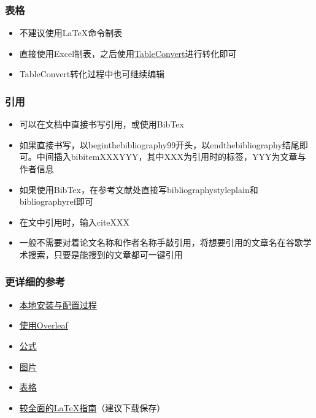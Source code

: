 \documentclass{beamer}
\begin{document}
\begin{frame} 
    \frametitle{表格} 
    \begin{itemize} 
        \item 不建议使用\LaTeX{}命令制表
        \item 直接使用Excel制表，之后使用\href{https://tableconvert.com/}{TableConvert}进行转化即可
        \item TableConvert转化过程中也可继续编辑
    \end{itemize} 
\end{frame}

\begin{frame} 
    \frametitle{引用} 
    \begin{itemize} 
        \item 可以在文档中直接书写引用，或使用BibTex
        \item 如果直接书写，以begin{thebibliography}{99}开头，以end{thebibliography}结尾即可。中间插入bibitem{XXX}YYY，其中XXX为引用时的标签，YYY为文章与作者信息
        \item 如果使用BibTex，在参考文献处直接写bibliographystyle{plain}和bibliography{ref}即可
        \item 在文中引用时，输入cite{XXX}
        \item 一般不需要对着论文名称和作者名称手敲引用，将想要引用的文章名在谷歌学术搜索，只要是能搜到的文章都可一键引用
    \end{itemize} 
\end{frame}

\begin{frame} 
    \frametitle{更详细的参考} 
    \begin{itemize} 
        \item \href{https://zhuanlan.zhihu.com/p/38178015}{本地安装与配置过程}
        \item \href{https://zhuanlan.zhihu.com/p/67182742}{使用Overleaf}
        \item \href{https://blog.csdn.net/NSJim/article/details/109045914}{公式}
        \item \href{https://blog.csdn.net/qq_31347869/article/details/103832190}{图片}
        \item \href{https://blog.csdn.net/juechenyi/article/details/77116011}{表格}
        \item \href{https://ctan.org/tex-archive/info/lshort/chinese}{较全面的\LaTeX{}指南}（建议下载保存）
    \end{itemize} 
\end{frame}
\end{document}
